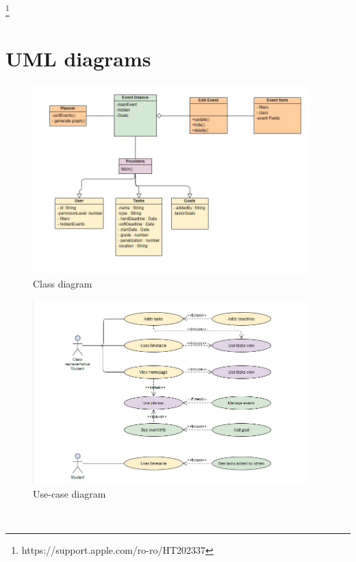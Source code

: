     ~
    
    \footnote{https://support.apple.com/ro-ro/HT202337}

\chapter{UML diagrams} \label{b:uml}


    \begin{figure}[ht]
        \centering
             \includegraphics[width=0.95\textwidth]{figures/uml/structure.jpeg}
        \caption{Class diagram} 
        \label{b:fig:class}
    \end{figure}
    
    \begin{figure}[ht]
        \centering
             \includegraphics[width=0.95\textwidth]{figures/uml/usecase.jpeg}
        \caption{Use-case diagram} 
        \label{b:fig:usecase}
    \end{figure}
    
~